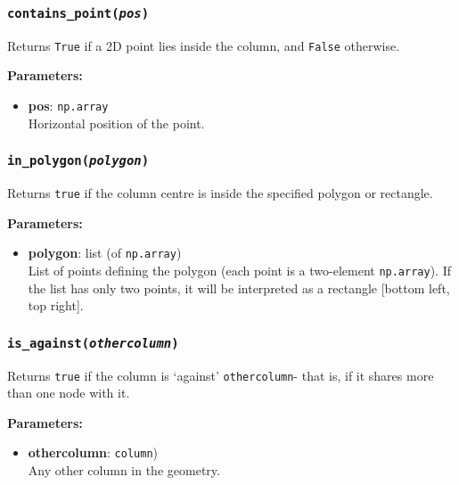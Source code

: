 \subsubsection{\texttt{contains\_point(\emph{pos})}}

Returns \texttt{True} if a 2D point lies inside the column, and \texttt{False} otherwise.

\textbf{Parameters:}
\begin{itemize}
\item \textbf{pos}: \texttt{np.array}\\
  Horizontal position of the point.
\end{itemize}

\subsubsection{\texttt{in\_polygon(\emph{polygon})}}

Returns \texttt{true} if the column centre is inside the specified polygon or rectangle.

\textbf{Parameters:}
\begin{itemize}
\item \textbf{polygon}: list (of \texttt{np.array})\\
  List of points defining the polygon (each point is a two-element \texttt{np.array}).  If the list has only two points, it will be interpreted as a rectangle [bottom left, top right].
\end{itemize}

\subsubsection{\texttt{is\_against(\emph{othercolumn})}}

Returns \texttt{true} if the column is `against' \texttt{othercolumn}- that is, if it shares more than one node with it.

\textbf{Parameters:}
\begin{itemize}
\item \textbf{othercolumn}: \texttt{column})\\
  Any other column in the geometry.
\end{itemize}

